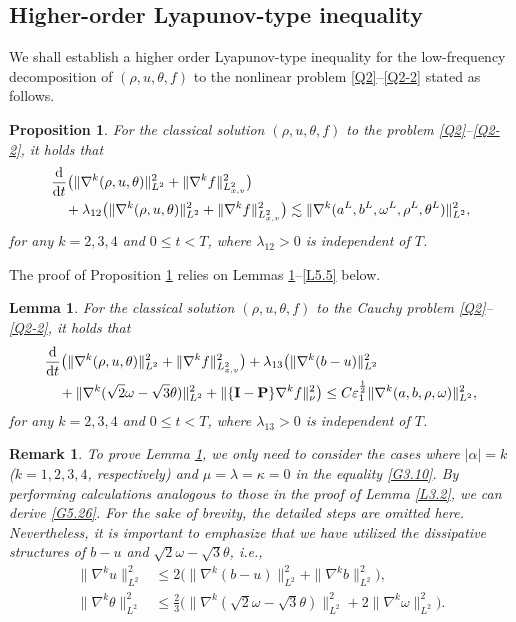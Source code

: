 \documentclass[reqno,11pt]{amsart}
\theoremstyle{plain}
\newtheorem{lem}[thm]{Lemma}
\newtheorem{prop}[thm]{Proposition}
\newtheorem{rem}{Remark}[section]
\numberwithin{equation}{section}
\newcommand{\eps}{{\varepsilon}}
\begin{document}
\subsection{Higher-order Lyapunov-type inequality }
We shall establish a higher order   Lyapunov-type inequality for the low-frequency decomposition of $(\rho, u, \theta, f)$ to the nonlinear problem \eqref{Q2}--\eqref{Q2-2} stated as follows.

\begin{prop}\label{P5.2}
For the classical solution $(\rho, u, \theta, f)$ to the problem  \eqref{Q2}--\eqref{Q2-2}, it holds that  
\begin{align}\label{G5.25}  
&\frac{\rm d}{{\rm d}t}\big( \|\nabla^k(\rho,u,\theta)\|_{L^2}^2+\|\nabla^k f\|_{L_{x,v}^2}^2\big) \nonumber\\  
&\quad+ \lambda_{12}\big(  \|\nabla^k(\rho,u,\theta)\|_{L^2}^2+\|\nabla^k f\|_{L_{x,v}^2}^2\big) \lesssim \|\nabla^k(a^L,b^L,\omega^L,\rho^L,\theta^L)\|_{L^2}^2,  
\end{align}  
for any $k=2,3,4$ and $0 \leq t < T$, where $\lambda_{12}>0$ is independent of $T$.
\end{prop}

The proof of Proposition \ref{P5.2}   relies on Lemmas \ref{L5.3}--\ref{L5.5} below. %


\begin{lem}\label{L5.3}
For the  classical solution $(\rho, u,\theta,f)$ to the Cauchy problem \eqref{Q2}--\eqref{Q2-2}, it holds that 
\begin{align}\label{G5.26}
&\frac{\rm d}{{\rm d}t}\big(\|\nabla^k(\rho,u,\theta)\|_{L^2}^{2} 
+\|\nabla^k f\|_{L_{x,v}^2}^2\big)+\lambda_{13} \big(\|\nabla^k(b-u)\|_{L^2}^{2}
\nonumber\\
& \quad+\|\nabla^k(\sqrt{2}\omega-\sqrt{3}\theta)\|_{L^2}^2
+\|\{\mathbf{I}-\mathbf{P}\}\nabla^k f\|_{\nu}^{2}\big)
\leq C\eps_1^\frac{1}{2} \|\nabla^k(a,b,\rho,\omega)\|_{L^2}^2,
\end{align}
for any $k=2,3,4$ and $0 \leq t < T$, where $\lambda_{13}>0$ is independent of $T$. 
\end{lem}

\begin{rem}
To prove Lemma \ref{L5.3}, we only need to consider the cases where $|\alpha|=k$ 
\emph{(}$k=1,2,3,4$, respectively\emph{)} and $\mu=\lambda=\kappa=0$ in the equality
 \eqref{G3.10}. By performing calculations analogous to those in the 
 proof of Lemma \ref{L3.2}, we can derive \eqref{G5.26}. For the sake of brevity, 
 the detailed steps are omitted here. Nevertheless, it is important to emphasize 
 that we have utilized the dissipative structures of $b-u$ and $\sqrt{2}\omega-\sqrt{3}\theta$, i.e.,
\begin{align*}  
\|\nabla^k u\|_{L^2}^2 &\leq 2\big(\|\nabla^k(b-u)\|_{L^2}^2+\|\nabla^k b\|_{L^2}^2\big), \\  
\|\nabla^k \theta\|_{L^2}^2 &\leq \frac{2}{3}\big(\|\nabla^k(\sqrt{2}\omega-\sqrt{3}\theta)\|_{L^2}^2 + 2\|\nabla^k \omega\|_{L^2}^2\big).  
\end{align*}  
\end{rem}
\end{document}

